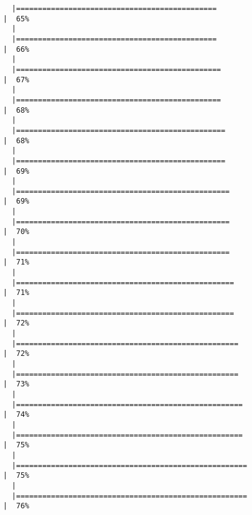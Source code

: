 \documentclass[
  letterpaper,
]{book}
\begin{document}
\begin{verbatim}
  |==============================================                        |  65%
  |                                                                            
  |==============================================                        |  66%
  |                                                                            
  |===============================================                       |  67%
  |                                                                            
  |===============================================                       |  68%
  |                                                                            
  |================================================                      |  68%
  |                                                                            
  |================================================                      |  69%
  |                                                                            
  |=================================================                     |  69%
  |                                                                            
  |=================================================                     |  70%
  |                                                                            
  |=================================================                     |  71%
  |                                                                            
  |==================================================                    |  71%
  |                                                                            
  |==================================================                    |  72%
  |                                                                            
  |===================================================                   |  72%
  |                                                                            
  |===================================================                   |  73%
  |                                                                            
  |====================================================                  |  74%
  |                                                                            
  |====================================================                  |  75%
  |                                                                            
  |=====================================================                 |  75%
  |                                                                            
  |=====================================================                 |  76%

\end{verbatim}
\end{document}
